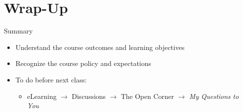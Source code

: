 
\section{Wrap-Up}
\begin{frame}{ Summary}
    \begin{itemize}
        \item Understand the course outcomes and learning objectives
        \item Recognize the course policy and expectations
        \item To do before next class:
        \begin{itemize}
            \item eLearning $\rightarrow$ Discussions $\rightarrow$ The Open Corner $\rightarrow$ \textit{My Questions to You}
        \end{itemize}
    \end{itemize}
\end{frame}

